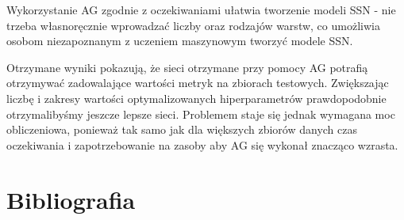 \documentclass{article}
\begin{document}
Wykorzystanie AG zgodnie z oczekiwaniami ułatwia tworzenie modeli SSN - nie trzeba własnoręcznie
wprowadzać liczby oraz rodzajów warstw, co umożliwia osobom niezapoznanym z uczeniem
maszynowym tworzyć modele SSN.

Otrzymane wyniki pokazują, że sieci otrzymane przy pomocy AG potrafią otrzymywać zadowalające
wartości metryk na zbiorach testowych. Zwiększając liczbę i zakresy wartości optymalizowanych
hiperparametrów prawdopodobnie otrzymalibyśmy jeszcze lepsze sieci. Problemem staje się
jednak wymagana moc obliczeniowa, ponieważ tak samo jak dla większych zbiorów danych
czas oczekiwania i zapotrzebowanie na zasoby aby AG się wykonał znacząco wzrasta.

\section{Bibliografia}
\printbibliography
\end{document}
